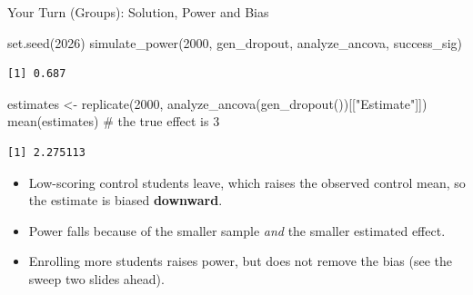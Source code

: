 \documentclass[
  ignorenonframetext,
  aspectratio=169,
]{beamer}
\newenvironment{Shaded}{\begin{snugshade}}{\end{snugshade}}
\newcommand{\CommentTok}[1]{\textcolor[rgb]{0.37,0.37,0.37}{#1}}
\newcommand{\DecValTok}[1]{\textcolor[rgb]{0.68,0.00,0.00}{#1}}
\newcommand{\FunctionTok}[1]{\textcolor[rgb]{0.28,0.35,0.67}{#1}}
\newcommand{\NormalTok}[1]{\textcolor[rgb]{0.00,0.23,0.31}{#1}}
\newcommand{\OtherTok}[1]{\textcolor[rgb]{0.00,0.23,0.31}{#1}}
\newcommand{\StringTok}[1]{\textcolor[rgb]{0.13,0.47,0.30}{#1}}
\providecommand{\tightlist}{%
  \setlength{\itemsep}{0pt}\setlength{\parskip}{0pt}}
\begin{document}
\begin{frame}[fragile]{Your Turn (Groups): Solution, Power and Bias}
\label{your-turn-groups-solution-power-and-bias}
\begin{Shaded}
\begin{Highlighting}[]
\FunctionTok{set.seed}\NormalTok{(}\DecValTok{2026}\NormalTok{)}
\FunctionTok{simulate\_power}\NormalTok{(}\DecValTok{2000}\NormalTok{, gen\_dropout, analyze\_ancova, success\_sig)}
\end{Highlighting}
\end{Shaded}

\begin{verbatim}
[1] 0.687
\end{verbatim}

\begin{Shaded}
\begin{Highlighting}[]
\NormalTok{estimates }\OtherTok{\textless{}{-}} \FunctionTok{replicate}\NormalTok{(}\DecValTok{2000}\NormalTok{, }\FunctionTok{analyze\_ancova}\NormalTok{(}\FunctionTok{gen\_dropout}\NormalTok{())[[}\StringTok{"Estimate"}\NormalTok{]])}
\FunctionTok{mean}\NormalTok{(estimates) }\CommentTok{\# the true effect is 3}
\end{Highlighting}
\end{Shaded}

\begin{verbatim}
[1] 2.275113
\end{verbatim}

\small

\begin{itemize}
\tightlist
\item
  Low-scoring control students leave, which raises the observed control
  mean, so the estimate is biased \textbf{downward}.
\item
  Power falls because of the smaller sample \textit{and} the smaller
  estimated effect.
\item
  Enrolling more students raises power, but does not remove the bias
  (see the sweep two slides ahead).
\end{itemize}
\end{frame}
\end{document}
